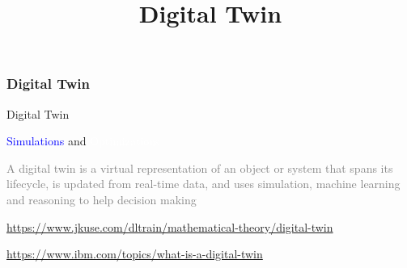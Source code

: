 


\title[Systems Engineering]{Digital Twin} 


\begin{frame}
\frametitle{ Digital Twin }
\begin{block}{ Digital Twin }

 \vspace{1cm}
  

 \colorbox{gray!35}{ \textcolor{blue}{ Simulations } } and 
  \colorbox{blue!47}{ \textcolor{white}{ Optimizations } }

  \vspace{1cm}
  
{ \textcolor{gray}{ A digital twin is a virtual representation of an object   or system that spans its lifecycle, is updated from real-time data, and uses simulation, machine learning and reasoning to help decision making } }


\end{block}
\end{frame}



\newpage

\url{https://www.jkuse.com/dltrain/mathematical-theory/digital-twin} 

\url{https://www.ibm.com/topics/what-is-a-digital-twin}
